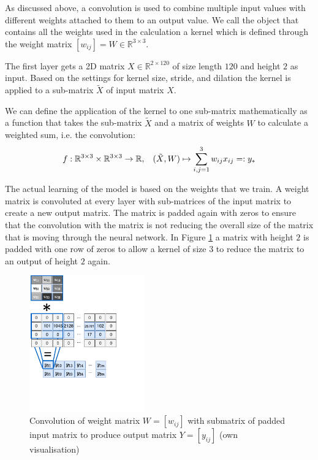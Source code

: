 \documentclass{article}
\begin{document}
As discussed above, a convolution is used to combine multiple input values with different weights attached to them to an output value. We call the object that contains all the weights used in the calculation a kernel which is defined through the weight matrix $[w_{ij}]=W\in\mathbb{R}^{3 \times 3}$.

The first layer gets a 2D matrix $X\in\mathbb{R}^{2\times 120}$ of size length $120$ and height $2$ as input. Based on the settings for kernel size, stride, and dilation the kernel is applied to a sub-matrix $\tilde{X}$ of input matrix $X$.

We can define the application of the kernel to one sub-matrix mathematically as a function that takes the sub-matrix $\tilde{X}$ and a matrix of weights $W$ to calculate a weighted sum, i.e. the convolution:
$$f:\mathbb{R}^{3\times 3}\times\mathbb{R}^{3 \times 3}\rightarrow \mathbb{R}, \hspace{0.3cm}(\tilde{X},W)\mapsto \sum_{i,j=1}^3 w_{ij} x_{ij} =:y_* $$

The actual learning of the model is based on the weights that we train. A weight matrix is convoluted at every layer with sub-matrices of the input matrix to create a new output matrix. The matrix is padded again with zeros to ensure that the convolution with the matrix is not reducing the overall size of the matrix that is moving through the neural network. In Figure \ref{fig:convolution} a matrix with height $2$ is padded with one row of zeros to allow a kernel of size $3$ to reduce the matrix to an output of height $2$ again.

\begin{figure}[ht]
    \begin{center}
        \includegraphics[width=5cm,keepaspectratio]{writing/02_final-report-latex/figures/processing-convolution.pdf}
        \caption{Convolution of weight matrix $W=[w_{ij}]$ with submatrix of padded input matrix to produce output matrix $Y=[y_{ij}]$ (own visualisation)}
        \label{fig:convolution}
    \end{center}
\end{figure}
\end{document}
